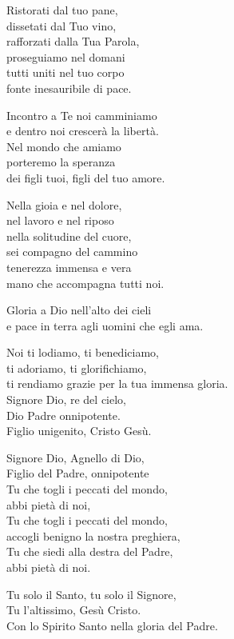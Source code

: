 \documentclass[11pt]{book}
\begin{document}
\settowidth{\versewidth}{Ristorati dal tuo pane,}
\begin{canzone}%
Ristorati dal tuo pane,\\
dissetati dal Tuo vino,\\
rafforzati dalla Tua Parola,\\
proseguiamo nel domani\\
tutti uniti nel tuo corpo\\
fonte inesauribile di pace.

\begin{ritornello}
Incontro a Te noi camminiamo\\
e dentro noi crescerà la libertà.\\
Nel mondo che amiamo\\
porteremo la speranza\\
dei figli tuoi, figli del tuo amore.%
\end{ritornello}

Nella gioia e nel dolore,\\
nel lavoro e nel riposo\\
nella solitudine del cuore,\\
sei compagno del cammino\\
tenerezza immensa e vera\\
mano che accompagna tutti noi.
\end{canzone}
\introduzione

\membatt

\vspace{-0.5\baselineskip}
\settowidth{\versewidth}{ti rendiamo grazie per la tua immensa gloria.}
\begin{canzone}%
\begin{ritornello}
Gloria a Dio nell'alto dei cieli\\
e pace in terra agli uomini che egli ama.
\end{ritornello}

Noi ti lodiamo, ti benediciamo,\\
ti adoriamo, ti glorifichiamo,\\
ti rendiamo grazie per la tua immensa gloria.\\
Signore Dio, re del cielo,\\
Dio Padre onnipotente.\\
Figlio unigenito, Cristo Gesù.

Signore Dio, Agnello di Dio,\\
Figlio del Padre, onnipotente\\
Tu che togli i peccati del mondo,\\
abbi pietà di noi,\\
Tu che togli i peccati del mondo,\\
accogli benigno la nostra preghiera,\\
Tu che siedi alla destra del Padre,\\
abbi pietà di noi.

Tu solo il Santo, tu solo il Signore,\\
Tu l'altissimo, Gesù Cristo.\\
Con lo Spirito Santo nella gloria del Padre.
\end{canzone}
\end{document}
